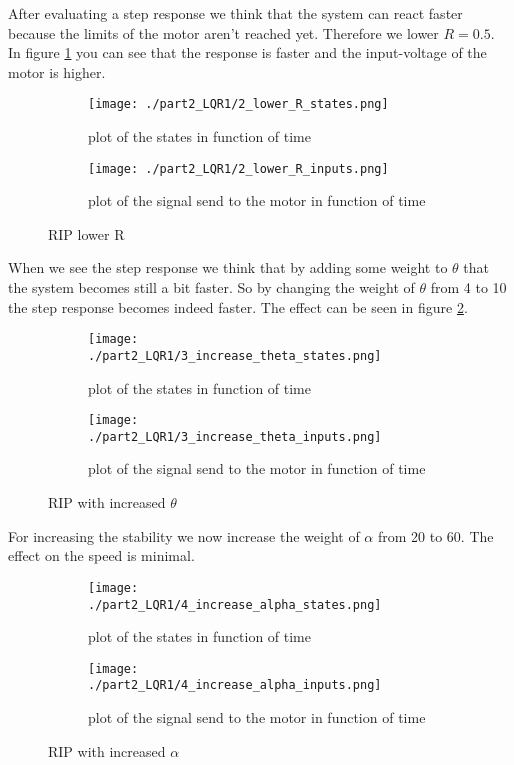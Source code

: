 After evaluating a step response we think that the system can react faster because the limits of the motor aren't reached yet. Therefore we lower $ R = 0.5$. In figure \ref{fig:lowR} you can see that the response is faster and the input-voltage of the motor is higher.

\begin{figure}[H]
	\centering
	\begin{subfigure}[b]{0.45\textwidth}
		\texttt{[image: ./part2\_LQR1/2\_lower\_R\_states.png]}
		\caption{plot of the states in function of time}
	\end{subfigure}
	\begin{subfigure}[b]{0.45\textwidth}
		\texttt{[image: ./part2\_LQR1/2\_lower\_R\_inputs.png]}
		\caption{plot of the signal send to the motor in function of time}
	\end{subfigure}
	\caption{RIP lower R}
	\label{fig:lowR}
\end{figure}

When we see the step response we think that by adding some weight to $\theta$ that the system becomes still a bit faster. So by changing the weight of $\theta$ from 4 to 10 the step response becomes indeed faster. The effect can be seen in figure \ref{fig:heighT}.

\begin{figure}[H]
	\centering
	\begin{subfigure}[b]{0.45\textwidth}
		\texttt{[image: ./part2\_LQR1/3\_increase\_theta\_states.png]}
		\caption{plot of the states in function of time}
	\end{subfigure}
	\begin{subfigure}[b]{0.45\textwidth}
		\texttt{[image: ./part2\_LQR1/3\_increase\_theta\_inputs.png]}
		\caption{plot of the signal send to the motor in function of time}
	\end{subfigure}
	\caption{RIP with increased $\theta$}
	\label{fig:heighT}
\end{figure}

For increasing the stability we now increase the weight of $\alpha$ from 20 to 60. The effect on the speed is minimal.

\begin{figure}[H]
	\centering
	\begin{subfigure}[b]{0.45\textwidth}
		\texttt{[image: ./part2\_LQR1/4\_increase\_alpha\_states.png]}
		\caption{plot of the states in function of time}
	\end{subfigure}
	\begin{subfigure}[b]{0.45\textwidth}
		\texttt{[image: ./part2\_LQR1/4\_increase\_alpha\_inputs.png]}
		\caption{plot of the signal send to the motor in function of time}
	\end{subfigure}
	\caption{RIP with increased $\alpha$}
\end{figure}

